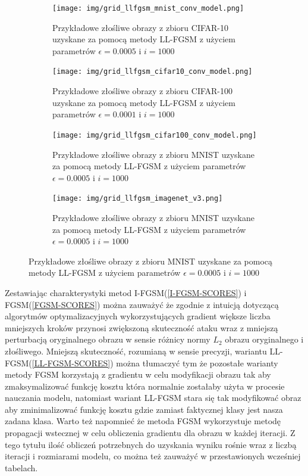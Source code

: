 \documentclass[
    left=2.5cm,         %
    right=2.5cm,        %
    top=2.5cm,          %
    bottom=3cm,         %
    bindingoffset=6mm,  %
    nohyphenation=false %
]{eiti/eiti-thesis}
\begin{document}
\pagebreak

\begin{figure}[H]
    \caption{Przykłady wygenerowanych złośliwych przykładów z zadaną klasą za pomocą metody LL-FGSM}

    \begin{subfigure}[t]{0.48\textwidth}
        \texttt{[image: img/grid\_llfgsm\_mnist\_conv\_model.png]}
        \caption{Przykładowe złośliwe obrazy z zbioru CIFAR-10 uzyskane za pomocą metody LL-FGSM z użyciem parametrów \(\epsilon=0.0005\) i \(i=1000\)}
        \label{fig:mnist_grid_llfgsm}
    \end{subfigure}%
    \hfill
    \begin{subfigure}[t]{0.48\textwidth}
        \texttt{[image: img/grid\_llfgsm\_cifar10\_conv\_model.png]}
        \caption{Przykładowe złośliwe obrazy z zbioru CIFAR-100 uzyskane za pomocą metody LL-FGSM z użyciem parametrów \(\epsilon=0.0001\) i \(i=1000\)}
        \label{fig:cifar10_grid_llfgsm}
    \end{subfigure}%

    \begin{subfigure}[t]{0.48\textwidth}
        \texttt{[image: img/grid\_llfgsm\_cifar100\_conv\_model.png]}
        \caption{Przykładowe złośliwe obrazy z zbioru MNIST uzyskane za pomocą metody LL-FGSM z użyciem parametrów \(\epsilon=0.0005\) i \(i=1000\)}
        \label{fig:cifar100_grid_llfgsm}
    \end{subfigure}%
    \hfill
    \begin{subfigure}[t]{0.48\textwidth}
        \texttt{[image: img/grid\_llfgsm\_imagenet\_v3.png]}
        \caption{Przykładowe złośliwe obrazy z zbioru MNIST uzyskane za pomocą metody LL-FGSM z użyciem parametrów \(\epsilon=0.0005\) i \(i=1000\)}
        \label{fig:imagenet_grid_llfgsm}
    \end{subfigure}%


\end{figure}

Zestawiając charakterystyki metod I-FGSM(\ref{I-FGSM-SCORES}) i FGSM(\ref{FGSM-SCORES}) można zauważyć że zgodnie z intuicją dotyczącą
algorytmów optymalizacyjnych wykorzystujących gradient większe liczba mniejszych kroków przynosi zwiększoną skuteczność ataku wraz
z mniejszą perturbacją oryginalnego obrazu w sensie różnicy normy \(L_2\) obrazu oryginalnego i złośliwego.
Mniejszą skuteczność, rozumianą w sensie precyzji, wariantu LL-FGSM(\ref{LL-FGSM-SCORES}) można tłumaczyć tym że pozostałe warianty
metody FGSM korzystają z gradientu w celu modyfikacji obrazu tak aby zmaksymalizować funkcję kosztu która normalnie zostałaby użyta w procesie nauczania modelu,
natomiast wariant LL-FGSM stara się tak modyfikować obraz aby zminimalizować funkcję kosztu gdzie zamiast faktycznej klasy jest nasza zadana klasa.
Warto też napomnieć że metoda FGSM wykorzystuje metodę propagacji wstecznej w celu obliczenia gradientu dla obrazu w każdej iteracji.
Z tego tytułu ilość obliczeń potrzebnych do uzyskania wyniku rośnie wraz z liczbą iteracji i rozmiarami modelu, co można też zauważyć w przestawionych wcześniej
tabelach.
\end{document}
